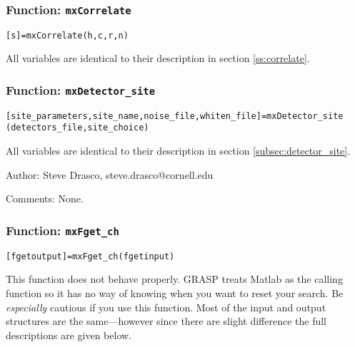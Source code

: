 \subsubsection{Function: {\tt mxCorrelate}}
\label{sss:mxCorrelate}

\texttt{[s]=mxCorrelate(h,c,r,n)}

All variables are identical to their description in section \ref{ss:correlate}.

\subsubsection{Function: {\tt mxDetector\_site}}
\label{sss:mxDetector_site}

\texttt{[site\_parameters,site\_name,noise\_file,whiten\_file]=mxDetector\_site} \\
\texttt{(detectors\_file,site\_choice)}

All variables are identical to their description in section \ref{subsec:detector_site}.

\begin{description}
\item{Author:} Steve Drasco, steve.drasco@cornell.edu
\item{Comments:} None.
\end{description}

\subsubsection{Function: {\tt mxFget\_ch}}
\label{sss:mxFget_ch}

\texttt{[fgetoutput]=mxFget\_ch(fgetinput)}

This function does not behave properly. GRASP treats Matlab as the calling
function so it has no way of knowing when you want to reset your search. Be
\emph{especially} cautious if you use this function. Most of the input and
output structures are the same---however since there are slight difference the
full descriptions are given below.

